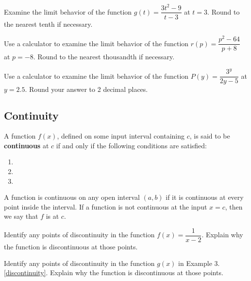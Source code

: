 \documentclass[notes]{subfiles}
\begin{document}
		\begin{ex}
			Examine the limit behavior of the function $g(t) = \dfrac{3t^2-9}{t-3}$ at $t = 3$.  Round to the nearest tenth if necessary.
		\end{ex}
			
			\newpage
			
		\begin{ex}
			Use a calculator to examine the limit behavior of the function $r(p) = \dfrac{p^2-64}{p+8}$ at $p = -8$.  Round to the nearest thousandth if necessary.
		\end{ex}
			

		\begin{ex}
			Use a calculator to examine the limit behavior of the function $P(y) = \dfrac{3^y}{2y-5}$ at $y = 2.5$.  Round your answer to 2 decimal places.
		\end{ex}
			\newpage
				
	\subsection*{Continuity}
		\begin{defn}[Continuity]
			A function $f(x)$, defined on some input interval containing $c$, is said to be \textbf{continuous} at $c$ if and only if the following conditions are satisfied:\\
			\begin{enumerate}[(1)]
				\item {}
				\item {}
				\item {}
			\end{enumerate}
			A function is continuous on any open interval $(a,b)$ if it is continuous at every point inside the interval.  If a function is not continuous at the input $x = c$, then we say that $f$ is  at $c$.
		\end{defn}

		\begin{ex}
			Identify any points of discontinuity in the function $f(x) = \dfrac{1}{x-2}$.  Explain why the function is discontinuous at those points.
		\end{ex}
		\begin{ex}
			Identify any points of discontinuity in the function $g(x)$ in Example 3.\ref{discontinuity}.  Explain why the function is discontinuous at those points.
		\end{ex}
			\newpage
\end{document}
